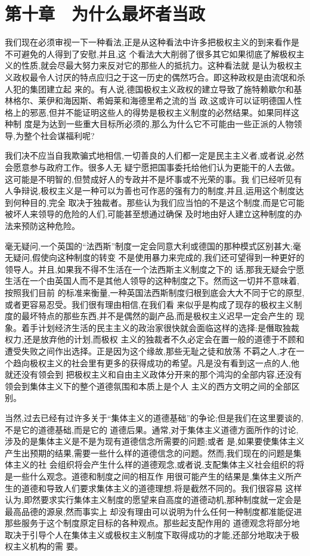 ﻿\documentclass[12pt]{article}
\begin{document}
\section{第十章　为什么最坏者当政}


我们现在必须审视一下一种看法,正是从这种看法中许多把极权主义的到来看作是不可避免的人得到了安慰,并且,这
个看法大大削弱了很多其它如果彻底了解极权主义的性质,就会尽最大努力来反对它的那些人的抵抗力。这种看法就
是认为极权主义政权最令人讨厌的特点应归之于这一历史的偶然巧合。即这种政权是由流氓和杀人犯的集团建立起
来的。有人说,德国极权主义政权的建立导致了施特赖歇尔和基林格尔、莱伊和海因斯、希姆莱和海德里希之流的当
政,这或许可以证明德国人性格上的邪恶,但并不能证明这些人的得势是极权主义制度的必然结果。如果同样这种制
度是为达到一些重大目标所必须的,那么为什么它不可能由一些正派的人物领导,为整个社会谋福利呢?

我们决不应当自我欺骗式地相信,一切善良的人们都一定是民主主义者,或者说,必然会愿意参与政府工作。很多人无
疑宁愿把国事委托给他们认为更能干的人去做。这可能是不明智的,但赞成好人的专政并不是坏事或不光荣的事。我
们已经听见有人争辩说,极权主义是一种可以为善也可作恶的强有力的制度,并且,运用这个制度达到何种目的,完全
取决于独裁者。那些认为我们应当怕的不是这个制度,而是它可能被坏人来领导的危险的人们,可能甚至想通过确保
及时地由好人建立这种制度的办法来预防这种危险。

毫无疑问,一个英国的``法西斯''制度一定会同意大利或德国的那种模式区别甚大;毫无疑问,假使向这种制度的转变
不是使用暴力来完成的,我们还可望得到一种更好的领导人。并且,如果我不得不生活在一个法西斯主义制度之下的
话,那我无疑会宁愿生活在一个由英国人而不是其他人领导的这种制度之下。然而这一切并不意味着,按照我们目前
的标准来衡量,一种英国法西斯制度归根到底会大大不同于它的原型,或者更容易忍受。我们很有理由相信,在我们看
来似乎是构成了现存的极权主义制度的最坏特点的那些东西,并不是偶然的副产品,而是极权主义迟早一定会产生的
现象。着手计划经济生活的民主主义的政治家很快就会面临这样的选择:是僭取独裁权力,还是放弃他的计划,而极权
主义的独裁者不久必定会在置一般的道德于不顾和遭受失败之间作出选择。正是因为这个缘故,那些无耻之徒和放荡
不羁之人,才在一个趋向极权主义的社会里有更多的获得成功的希望。凡是没有看到这一点的人,他就还没有领会到
把极权主义和自由主义政体分开来的那个鸿沟的全部内容,还没有领会到集体主义下的整个道德氛围和本质上是个人
主义的西方文明之间的全部区别。

当然,过去已经有过许多关于``集体主义的道德基础''的争论;但是我们在这里要谈的,不是它的道德基础,而是它的
道德后果。通常,对于集体主义道德方面所作的讨论,涉及的是集体主义是不是为现有道德信念所需要的问题;或者
是,如果要使集体主义产生出预期的结果,需要一些什么样的道德信念的问题。然而,我们现在的问题是集体主义的社
会组织将会产生什么样的道德观念,或者说,支配集体主义社会组织的将是一些什么观念。道德和制度之间的相互作
用很可能产生的结果是,集体主义所产生的道德和导致人们要求集体主义的道德理想,将是截然不同的。我们很容易
这样认为,即然要求实行集体主义制度的愿望来自高度的道德动机,那种制度就一定会是最高品德的源泉,然而事实上
却没有理由可以说明为什么任何一种制度都准能促进那些服务于这个制度原定目标的各种观点。那些起支配作用的
道德观念将部分地取决于引导个人在集体主义或极权主义制度下取得成功的才能,还部分地取决于极权主义机构的需
要。
\end{document}
